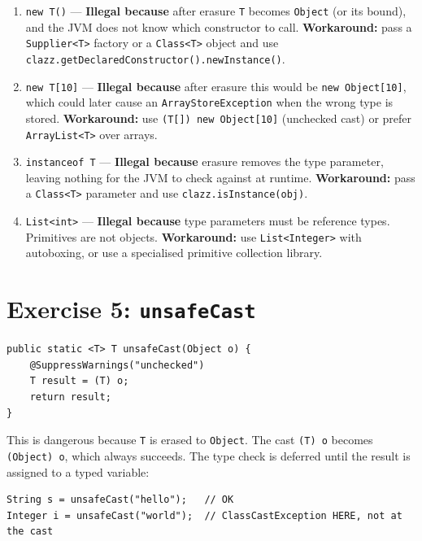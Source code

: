 \documentclass[twoside=false,DIV=14]{scrartcl}
\begin{document}
\begin{enumerate}
    \item \texttt{new T()} --- \textbf{Illegal because} after erasure \texttt{T} becomes \texttt{Object} (or its bound), and the JVM does not know which constructor to call.  \textbf{Workaround:} pass a \texttt{Supplier<T>} factory or a \texttt{Class<T>} object and use \texttt{clazz.getDeclaredConstructor().newInstance()}.

    \item \texttt{new T[10]} --- \textbf{Illegal because} after erasure this would be \texttt{new Object[10]}, which could later cause an \texttt{ArrayStoreException} when the wrong type is stored.  \textbf{Workaround:} use \texttt{(T[]) new Object[10]} (unchecked cast) or prefer \texttt{ArrayList<T>} over arrays.

    \item \texttt{instanceof T} --- \textbf{Illegal because} erasure removes the type parameter, leaving nothing for the JVM to check against at runtime.  \textbf{Workaround:} pass a \texttt{Class<T>} parameter and use \texttt{clazz.isInstance(obj)}.

    \item \texttt{List<int>} --- \textbf{Illegal because} type parameters must be reference types.  Primitives are not objects.  \textbf{Workaround:} use \texttt{List<Integer>} with autoboxing, or use a specialised primitive collection library.
\end{enumerate}


\section*{Exercise 5: \texttt{unsafeCast}}

\begin{lstlisting}
public static <T> T unsafeCast(Object o) {
    @SuppressWarnings("unchecked")
    T result = (T) o;
    return result;
}
\end{lstlisting}

This is dangerous because \texttt{T} is erased to \texttt{Object}.  The cast \texttt{(T) o} becomes \texttt{(Object) o}, which always succeeds.  The type check is deferred until the result is assigned to a typed variable:

\begin{lstlisting}
String s = unsafeCast("hello");   // OK
Integer i = unsafeCast("world");  // ClassCastException HERE, not at the cast
\end{lstlisting}
\end{document}
